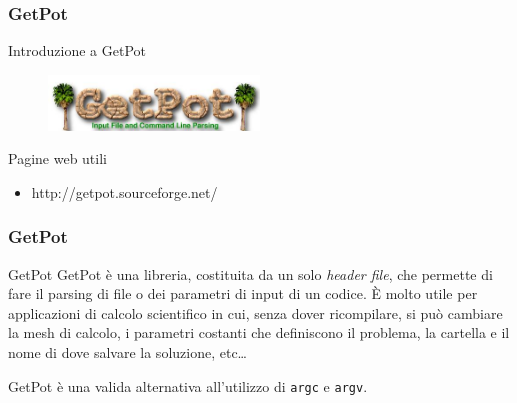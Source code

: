 \documentclass{beamer}
\author{Alessio Fumagalli}
\date{10-11-2011}
\institute{Politecnico di Milano}
\begin{document}

\begin{frame}

    \frametitle{GetPot}

    \begin{block}{Introduzione a}
        \centering
        GetPot
    \end{block}

    \begin{figure}
        \centering
        \includegraphics[width=0.5\textwidth]{images/GetPotLogo2}
    \end{figure}

    \begin{block}{Pagine web utili}
        \centering
        \begin{itemize}
            \item http://getpot.sourceforge.net/
        \end{itemize}
    \end{block}

\end{frame}


\begin{frame}

    \frametitle{GetPot}

    \begin{block}{GetPot}
        GetPot \`e una libreria, costituita da un solo \emph{header file},
        che permette di fare il parsing di file o dei parametri di input di un
        codice.
        \`E molto utile per applicazioni di calcolo scientifico
        in cui, senza dover ricompilare, si pu\`o cambiare la mesh di calcolo,
        i parametri costanti che definiscono il problema, la cartella e il nome
        di dove salvare la soluzione, etc\ldots
    \end{block}

    \vspace{.2cm}

    \begin{block}{ }
        GetPot \`e una valida alternativa all'utilizzo di \texttt{argc} e \texttt{argv}.
    \end{block}

\end{frame}
\end{document}
